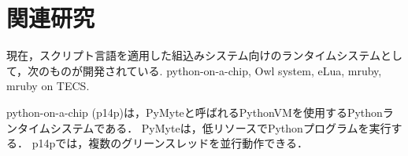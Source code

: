 \documentclass[submit,techrep]{ipsj}
\begin{document}
\section{関連研究}
\vspace{-2mm}
\label{sec:Related Work}
現在，スクリプト言語を適用した組込みシステム向けのランタイムシステムとして，次のものが開発されている.
python-on-a-chip\cite{url:python-on-a-chip}, Owl system\cite{par:owl}, eLua\cite{url:eLua}, mruby\cite{par:mruby}, mruby on TECS\cite{par:mrubyonTECS}.

python-on-a-chip (p14p)は，PyMyteと呼ばれるPythonVMを使用するPythonランタイムシステムである．
PyMyteは，低リソースでPythonプログラムを実行する．
p14pでは，複数のグリーンスレッドを並行動作できる．
\end{document}
